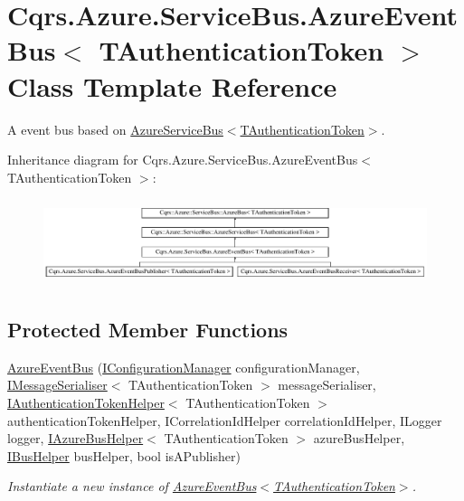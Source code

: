 \hypertarget{classCqrs_1_1Azure_1_1ServiceBus_1_1AzureEventBus}{}\section{Cqrs.\+Azure.\+Service\+Bus.\+Azure\+Event\+Bus$<$ T\+Authentication\+Token $>$ Class Template Reference}
\label{classCqrs_1_1Azure_1_1ServiceBus_1_1AzureEventBus}


A event bus based on \hyperlink{classCqrs_1_1Azure_1_1ServiceBus_1_1AzureServiceBus_a44845c00c29574c2fa2d43a8a6b124ca_a44845c00c29574c2fa2d43a8a6b124ca}{Azure\+Service\+Bus$<$\+T\+Authentication\+Token$>$}.  


Inheritance diagram for Cqrs.\+Azure.\+Service\+Bus.\+Azure\+Event\+Bus$<$ T\+Authentication\+Token $>$\+:\begin{figure}[H]
\begin{center}
\leavevmode
\includegraphics[height=2.533937cm]{classCqrs_1_1Azure_1_1ServiceBus_1_1AzureEventBus}
\end{center}
\end{figure}
\subsection*{Protected Member Functions}
\begin{DoxyCompactItemize}
\item 
\hyperlink{classCqrs_1_1Azure_1_1ServiceBus_1_1AzureEventBus_aaaf74d2e4e79924b7231750478508ed6_aaaf74d2e4e79924b7231750478508ed6}{Azure\+Event\+Bus} (\hyperlink{interfaceCqrs_1_1Configuration_1_1IConfigurationManager}{I\+Configuration\+Manager} configuration\+Manager, \hyperlink{interfaceCqrs_1_1Azure_1_1ServiceBus_1_1IMessageSerialiser}{I\+Message\+Serialiser}$<$ T\+Authentication\+Token $>$ message\+Serialiser, \hyperlink{interfaceCqrs_1_1Authentication_1_1IAuthenticationTokenHelper}{I\+Authentication\+Token\+Helper}$<$ T\+Authentication\+Token $>$ authentication\+Token\+Helper, I\+Correlation\+Id\+Helper correlation\+Id\+Helper, I\+Logger logger, \hyperlink{interfaceCqrs_1_1Azure_1_1ServiceBus_1_1IAzureBusHelper}{I\+Azure\+Bus\+Helper}$<$ T\+Authentication\+Token $>$ azure\+Bus\+Helper, \hyperlink{interfaceCqrs_1_1Bus_1_1IBusHelper}{I\+Bus\+Helper} bus\+Helper, bool is\+A\+Publisher)
\begin{DoxyCompactList}\small\item\em Instantiate a new instance of \hyperlink{classCqrs_1_1Azure_1_1ServiceBus_1_1AzureEventBus_aaaf74d2e4e79924b7231750478508ed6_aaaf74d2e4e79924b7231750478508ed6}{Azure\+Event\+Bus$<$\+T\+Authentication\+Token$>$}. \end{DoxyCompactList}\end{DoxyCompactItemize}
